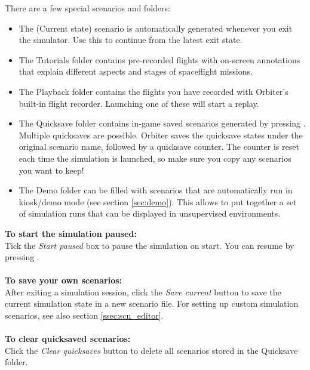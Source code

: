 \documentclass[Orbiter User Manual.tex]{subfiles}
\begin{document}
\begin{figure}[H]
	\centering
\end{figure}

\noindent
There are a few special scenarios and folders:

\begin{itemize}
\item The (Current state) scenario is automatically generated whenever you exit the simulator. Use this to continue from the latest exit state.
\item The Tutorials folder contains pre-recorded flights with on-screen annotations that explain different aspects and stages of spaceflight missions.
\item The Playback folder contains the flights you have recorded with Orbiter's built-in flight recorder. Launching one of these will start a replay.
\item The Quicksave folder contains in-game saved scenarios generated by pressing \Ctrl{}. Multiple quicksaves are possible. Orbiter saves the quicksave states under the original scenario name, followed by a quicksave counter. The counter is reset each time the simulation is launched, so make sure you copy any scenarios you want to keep!
\item The Demo folder can be filled with scenarios that are automatically run in kiosk/demo mode (see section \ref{sec:demo}). This allows to put together a set of simulation runs that can be displayed in unsupervised environments.
\end{itemize}

\noindent
\textbf{To start the simulation paused:}\\
Tick the \textit{Start paused} box to pause the simulation on start. You can resume by pressing \Ctrl{}.\\
\\
\textbf{To save your own scenarios:}\\
After exiting a simulation session, click the \textit{Save current} button to save the current simulation state in a new scenario file. For setting up custom simulation scenarios, see also section \ref{ssec:scn_editor}.\\
\\
\textbf{To clear quicksaved scenarios:}\\
Click the \textit{Clear quicksaves} button to delete all scenarios stored in the Quicksave folder.
\end{document}
